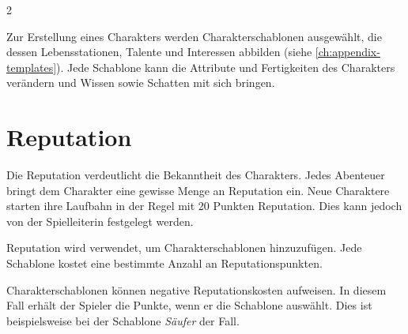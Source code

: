 \label{ch:create}

\begin{multicols}{2}

Zur Erstellung eines Charakters werden Charakterschablonen ausgewählt, die dessen Lebensstationen, Talente und Interessen abbilden (siehe \cref{ch:appendix-templates}). Jede Schablone kann die Attribute und Fertigkeiten des Charakters verändern und Wissen sowie Schatten mit sich bringen.


\section{Reputation}

Die Reputation verdeutlicht die Bekanntheit des Charakters. Jedes Abenteuer bringt dem Charakter eine gewisse Menge an Reputation ein. Neue Charaktere starten ihre Laufbahn in der Regel mit 20 Punkten Reputation. Dies kann jedoch von der Spielleiterin festgelegt werden.

Reputation wird verwendet, um Charakterschablonen hinzuzufügen. Jede Schablone kostet eine bestimmte Anzahl an Reputationspunkten.

Charakterschablonen können negative Reputationskosten aufweisen. In diesem Fall erhält der Spieler die Punkte, wenn er die Schablone auswählt. Dies ist beispielsweise bei der Schablone \textit{Säufer} der Fall.

\end{multicols}
